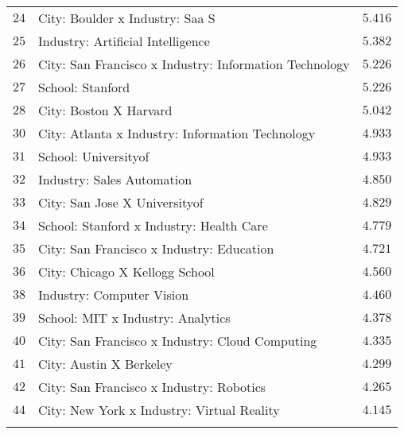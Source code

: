 \begin{tabular}{@{\extracolsep{5pt}} clc}
$24$ & City: Boulder x Industry: Saa S & $5.416$ \\ 
$25$ & Industry: Artificial Intelligence & $5.382$ \\ 
$26$ & City: San Francisco x Industry: Information Technology & $5.226$ \\ 
$27$ & School: Stanford & $5.226$ \\ 
$28$ & City: Boston X Harvard & $5.042$ \\ 
$30$ & City: Atlanta x Industry: Information Technology & $4.933$ \\ 
$31$ & School: Universityof & $4.933$ \\ 
$32$ & Industry: Sales Automation & $4.850$ \\ 
$33$ & City: San Jose X Universityof & $4.829$ \\ 
$34$ & School: Stanford x Industry: Health Care & $4.779$ \\ 
$35$ & City: San Francisco x Industry: Education & $4.721$ \\ 
$36$ & City: Chicago X Kellogg School & $4.560$ \\ 
$38$ & Industry: Computer Vision & $4.460$ \\ 
$39$ & School: MIT x Industry: Analytics & $4.378$ \\ 
$40$ & City: San Francisco x Industry: Cloud Computing & $4.335$ \\ 
$41$ & City: Austin X Berkeley & $4.299$ \\ 
$42$ & City: San Francisco x Industry: Robotics & $4.265$ \\ 
$44$ & City: New York x Industry: Virtual Reality & $4.145$ \\ 
\hline \\[-1.8ex] 
\end{tabular} 
